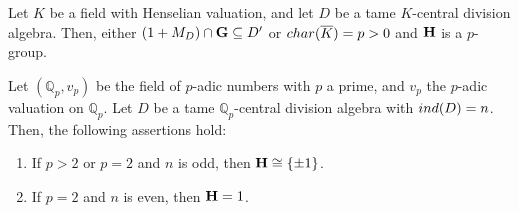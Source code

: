 \documentclass[10pt,a4paper]{amsart}
\begin{document}
\begin{theorem}\label{Theorem_p-group}
	Let $K$ be a field with Henselian valuation, and let $D$ be a tame $K$-central division algebra. Then, either $(1+M_D) \cap {\bf G} \subseteq D'$ or ${\rm char}(\overline{K})=p>0$ and ${\bf H}$ is a $p$-group.
\end{theorem}

\begin{proposition}\label{corollary_Qp}
	Let $(\mathbb{Q}_p,v_p)$ be the field of $p$-adic numbers with $p$ a prime, and $v_p$ the $p$-adic valuation on $\mathbb{Q}_p$. Let $D$ be a tame ${\mathbb{Q}_p}$-central division algebra with ${\rm ind}(D) = n$. Then, the following assertions hold:
	\begin{enumerate}[font=\normalfont]
		\item If $p>2$ or  $p=2$ and $n$ is odd, then ${\bf H}\cong \{\pm 1\}$.
		\item If $p=2$ and $n$ is even, then ${\bf H}=1$.
	\end{enumerate}
\end{proposition}
\end{document}

